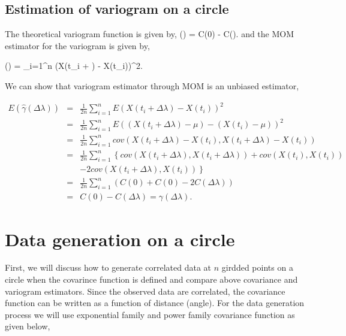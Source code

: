 \subsection{Estimation of variogram on a circle}

The theoretical variogram function is given by,
\beq
\gamma(\theta) = C(0) - C(\theta).
\eeq
and the MOM estimator for the variogram is given by,

\beq
\hat{\gamma}(\Delta \lambda) =  \sum_{i=1}^n (X(t_i + \Delta \lambda) - X(t_i))^2.
\eeq

We can show that variogram estimator through MOM is an unbiased estimator, 

\begin{eqnarray*}
	E(\hat{\gamma}(\Delta \lambda)) &=& \frac{1}{2n} \sum_{i = 1}^n E(X(t_i + \Delta \lambda) - X(t_i))^2 \\
	&=& \frac{1}{2n} \sum_{i = 1}^n E((X(t_i + \Delta \lambda)-\mu) - (X(t_i) - \mu))^2 \\
	&=& \frac{1}{2n} \sum_{i = 1}^n cov(X(t_i + \Delta \lambda) - X(t_i), X(t_i + \Delta \lambda) - X(t_i)) \\
	&=& \frac{1}{2n} \sum_{i = 1}^n \left\{ cov(X(t_i + \Delta \lambda), X(t_i + \Delta \lambda)) + cov(X(t_i), X(t_i)) \right. \\
	& & \left. - 2cov(X(t_i + \Delta \lambda), X(t_i)) \right\}\\
	&=& \frac{1}{2n} \sum_{i = 1}^n \left( C(0) + C(0) - 2C(\Delta \lambda)\right) \\
	&=& C(0) - C(\Delta \lambda) = \gamma(\Delta \lambda).
\end{eqnarray*}
 


\section{Data generation on a circle}



First, we will discuss how to generate correlated data at $n$ girdded points on a circle when the covarince function is defined and compare above covariance and variogram estimators. Since the observed data are correlated, the covariance function can be written as a function of distance (angle). For the data generation process we will use exponential family and power family covariance function as given below, 

